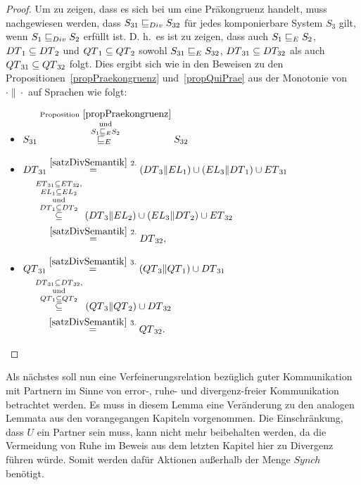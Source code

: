 \begin{proof}
  Um zu zeigen, dass es sich bei \DRel{} um eine Präkongruenz handelt, muss
  nachgewiesen werden, dass $S_{31}\sqsubseteq _{Div}{} S_{32}$ für jedes komponierbare
  System $S_3$ gilt, wenn $S_1\sqsubseteq _{Div}{} S_2$ erfüllt ist.  D.  h.\   es     ist
  zu zeigen, dass auch $S_1\sqsubseteq _E{} S_2$, $DT{}_1\subseteq DT{}_2$ und
  $QT{}_1\subseteq QT{}_2$ sowohl $S_{31}\sqsubseteq _E{} S_{32}$,
  $DT{}_{31}\subseteq DT_{32}$ als auch $QT{}_{31}\subseteq QT{}_{32}$
  folgt. Dies ergibt sich wie in den Beweisen zu den
  Propositionen~\ref{propPraekongruenz} und~\ref{propQuiPrae} aus der Monotonie
  von $\cdot\|\cdot$ auf Sprachen wie folgt:
  \begin{itemize}
    \item $\begin{aligned}[t]
        S_{31}
        \overset{\mathrm{Proposition}~\ref{propPraekongruenz}}{%
        \overset{\mathrm{und}}{\overset{S_1\ERel{} S_2}{\ERel{}}}} S_{32}
    \end{aligned}$
    \item $\begin{aligned}[t]
        \DT{}_{31} &\overset{\ref{satzDivSemantik}~2.}{=} (\DT{}_3\|\EL{}_1)
        \cup (\EL{}_3\|\DT{}_1) \cup \ET{}_{31}\\
        &\hspace{-0.5cm}\overset{\ET{}_{31}\subseteq
      \ET{}_{32},}{\overset{\EL{}_1\subseteq
      \EL{}_2}{\overset{\mathrm{und}}{\overset{\DT{}_1\subseteq
    \DT{}_2}{\subseteq}}}} (\DT{}_3\|\EL{}_2) \cup (\EL{}_3\|\DT{}_2) \cup
    \ET{}_{32}\\
      &\overset{\ref{satzDivSemantik}~2.}{=} \DT{}_{32},
    \end{aligned}$
    \item $\begin{aligned}[t]
        \QT{}_{31} &\overset{\ref{satzDivSemantik}~3.}{=} (\QT{}_3\|\QT{}_1)
        \cup \DT{}_{31}\\
        &\hspace{-0.5cm}\overset{\DT{}_{31}\subseteq
      \DT{}_{32},}{\overset{\mathrm{und}}{\overset{\QT{}_1\subseteq
      \QT{}_2}{\subseteq}}} (\QT{}_3\|\QT{}_2) \cup \DT{}_{32}\\
      &\overset{\ref{satzDivSemantik}~3.}{=} \QT{}_{32}.
    \end{aligned}$
  \end{itemize}
\end{proof}

Als nächstes soll nun eine Verfeinerungsrelation bezüglich guter Kommunikation
mit Partnern im Sinne von error-, ruhe- und divergenz-freier Kommunikation
betrachtet werden. Es muss in diesem Lemma eine Veränderung zu den analogen
Lemmata aus den vorangegangen Kapiteln vorgenommen. Die Einschränkung, dass $U$
ein Partner sein muss, kann nicht mehr beibehalten werden, da die Vermeidung
von Ruhe im Beweis aus dem letzten Kapitel hier zu Divergenz führen würde.
Somit werden dafür Aktionen außerhalb der Menge $Synch$ benötigt.

